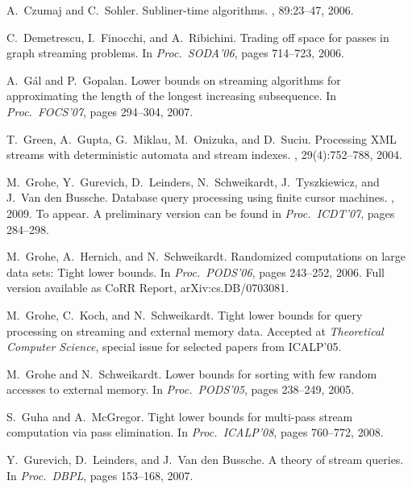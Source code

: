 \documentclass[proceedings]{stacs}
\theoremstyle{plain}\newtheorem{satz}[thm]{Satz}
\theoremstyle{definition}\newtheorem{crucial}[thm]{Crucial Definition}
\begin{document}
\begin{thebibliography}{10}
A.~Czumaj and C.~Sohler.
\newblock Subliner-time algorithms.
, 89:23--47, 2006.

C.~Demetrescu, I.~Finocchi, and A.~Ribichini.
\newblock Trading off space for passes in graph streaming problems.
\newblock In {\em Proc.\ SODA'06}, pages 714--723, 2006.

A.~G{\'a}l and P.~Gopalan.
\newblock Lower bounds on streaming algorithms for approximating the length of
  the longest increasing subsequence.
\newblock In {\em Proc.\ FOCS'07}, pages 294--304, 2007.

T.~Green, A.~Gupta, G.~Miklau, M.~Onizuka, and D.~Suciu.
\newblock Processing {XML} streams with deterministic automata and stream
  indexes.
, 29(4):752--788, 2004.

M.~Grohe, Y.~Gurevich, D.~Leinders, N.~Schweikardt, J.~Tyszkiewicz, and J.~{Van
  den Bussche}.
\newblock Database query processing using finite cursor machines.
, 2009.
\newblock To appear. A preliminary version can be found in \emph{Proc.\
  ICDT'07}, pages 284--298.

M.~Grohe, A.~Hernich, and N.~Schweikardt.
\newblock Randomized computations on large data sets: Tight lower bounds.
\newblock In {\em Proc.\ PODS'06}, pages 243--252, 2006.
\newblock Full version available as CoRR Report, arXiv:cs.DB/0703081.

M.~Grohe, C.~Koch, and N.~Schweikardt.
\newblock Tight lower bounds for query processing on streaming and external
  memory data.
\newblock Accepted at \emph{Theoretical Computer Science}, special issue for
  selected papers from ICALP'05.

M.~Grohe and N.~Schweikardt.
\newblock Lower bounds for sorting with few random accesses to external memory.
\newblock In {\em Proc.\ PODS'05}, pages 238--249, 2005.

S.~Guha and A.~McGregor.
\newblock Tight lower bounds for multi-pass stream computation via pass
  elimination.
\newblock In {\em Proc.\ ICALP'08}, pages 760--772, 2008.

Y.~Gurevich, D.~Leinders, and J.~{Van den Bussche}.
\newblock A theory of stream queries.
\newblock In {\em Proc.\ DBPL}, pages 153--168, 2007.


\end{thebibliography}
\end{document}
